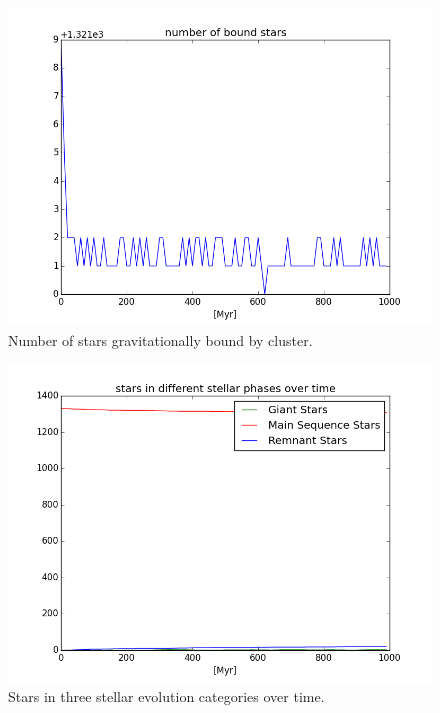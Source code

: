 \documentclass{aa}
\begin{document}
\begin{figure}
    \centering
    \includegraphics[width=\hsize]{img/bound_stars.png}
    \caption{Number of stars gravitationally bound by cluster.}\label{fig:bound_stars}
\end{figure}

\begin{figure}
    \centering
    \includegraphics[width=\hsize]{img/stellar_phases_counts.png}
    \caption{Stars in three stellar evolution categories over time.}\label{fig:phases}
\end{figure}
\end{document}
